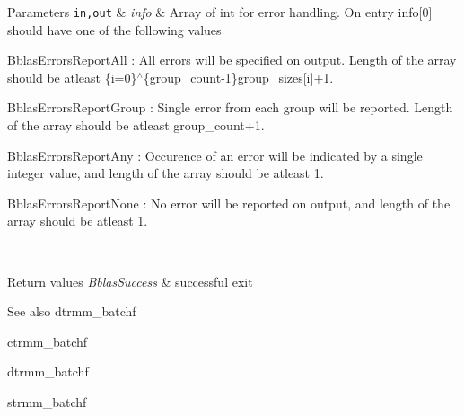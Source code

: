\begin{DoxyParams}[1]{Parameters}
\hline
\mbox{\tt in,out}  & {\em info} & Array of int for error handling. On entry info\mbox{[}0\mbox{]} should have one of the following values
\begin{DoxyItemize}
\item Bblas\+Errors\+Report\+All \+: All errors will be specified on output. Length of the array should be atleast \{i=0\}$^\wedge$\{group\+\_\+count-\/1\}group\+\_\+sizes\mbox{[}i\mbox{]}+1.
\item Bblas\+Errors\+Report\+Group \+: Single error from each group will be reported. Length of the array should be atleast group\+\_\+count+1.
\item Bblas\+Errors\+Report\+Any \+: Occurence of an error will be indicated by a single integer value, and length of the array should be atleast 1.
\item Bblas\+Errors\+Report\+None \+: No error will be reported on output, and length of the array should be atleast 1.
\end{DoxyItemize}\\
\hline
\end{DoxyParams}

\begin{DoxyRetVals}{Return values}
{\em Bblas\+Success} & successful exit\\
\hline
\end{DoxyRetVals}
\begin{DoxySeeAlso}{See also}
dtrmm\+\_\+batchf 

ctrmm\+\_\+batchf 

dtrmm\+\_\+batchf 

strmm\+\_\+batchf 
\end{DoxySeeAlso}
\mbox{\label{group__trmm__batchf_ga5c431462721e9faae6711830d473c713}} 
